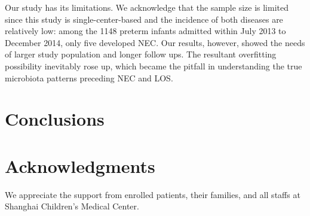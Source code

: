 \documentclass[fleqn,10pt,lineno]{wlpeerj} %
\begin{document}
\noindent
Our study has its limitations. We acknowledge that the sample size is limited since this study is single-center-based and the incidence of both diseases are relatively low: among the 1148 preterm infants admitted within July 2013 to December 2014, only five developed NEC. Our results, however, showed the needs of larger study population and longer follow ups. The resultant overfitting possibility inevitably rose up, which became the pitfall in understanding the true microbiota patterns preceding NEC and LOS.

\section*{Conclusions}

\section*{Acknowledgments}
We appreciate the support from enrolled patients, their families, and all staffs at Shanghai Children’s Medical Center.










\end{document}
